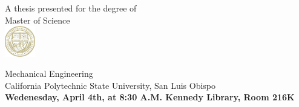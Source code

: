\documentclass[20pt]{article}
\begin{document}
\begin{center}
			A thesis presented for the degree of\\
			Master of Science\\[2pt]
			
			
			\includegraphics[width=0.1\textwidth]{./figures/cal-poly-university-seal.jpg}
			
			Mechanical Engineering\\
			California Polytechnic State University, San Luis Obispo\\[6pt]
			\textbf{Wedenesday, April 4th, at 8:30 A.M. Kennedy Library, Room 216K}
			



	\end{center}
\end{document}

